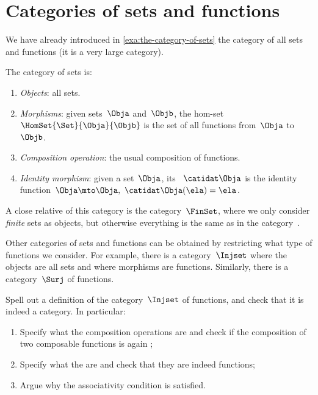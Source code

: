 
\section{Categories of sets and functions}

We have already introduced in \cref{exa:the-category-of-sets} the category of all sets and functions (it is a very large category).

\begin{ctdefinition}
    \label{def:Set}
    The category \Set of sets is:
    \begin{enumerate}
        \item \emph{Objects}: all sets.
        \item \emph{Morphisms}: given sets~$\Obja$ and~$\Objb$, the hom-set~$\HomSet{\Set}{\Obja}{\Objb}$ is the set of all functions from~$\Obja$ to~$\Objb$.
        \item \emph{Composition operation}: the usual composition of functions.
        \item \emph{Identity morphism}: given a set~$\Obja$, its ~$\catidat\Obja$ is the identity function~$\Obja \mto \Obja, \ \catidat\Obja(\ela) = \ela$.
    \end{enumerate}
\end{ctdefinition}

A close relative of this category is the category~$\FinSet$, where we only consider \emph{finite} sets as objects, but otherwise everything is the same as in the category~\Set.

Other categories of sets and functions can be obtained by restricting what type of functions we consider.
For example, there is a category~$\Injset$ where the objects are all sets and where morphisms are  functions.
Similarly, there is a category~$\Surj$ of  functions.

\begin{exercise}
    Spell out a definition of the category~$\Injset$ of  functions, and check that it is indeed a category.
    In particular:
    \begin{enumerate}
        \item Specify what the composition operations are and check if the composition of two composable  functions is again ;
        \item Specify what the   are and check that they are indeed  functions;
        \item Argue why the associativity condition is satisfied.
    \end{enumerate}
\end{exercise}


